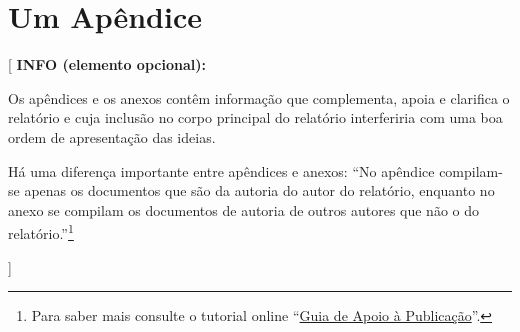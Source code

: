 \documentclass[11pt,a4paper]{report}
\newenvironment{infoopt}[1]{\vspace*{6mm}\color{blue}[ \textbf{INFO (elemento opcional):} \begin{em} #1}{\vspace*{3mm}\end{em} ]}
\begin{document}

\appendix
\chapter{Um Apêndice}

\begin{infoopt}
Os apêndices e os anexos contêm informação que complementa, apoia e
clarifica o relatório e cuja inclusão no corpo principal do relatório
interferiria com uma boa ordem de apresentação das ideias.

Há uma diferença importante entre apêndices e anexos: ``No apêndice
compilam-se apenas os documentos que são da autoria do autor do
relatório, enquanto no anexo se compilam os documentos de autoria de
outros autores que não o do relatório.''\footnote{%
Para saber mais consulte o tutorial online 
``\href{https://docs.google.com/document/d/1TDC1behVq8x7fQL4CcPEEh_np5GXviJevQxnQ9gbiJs/edit}
{Guia de Apoio à Publicação}''.}
\end{infoopt}

\end{document}
